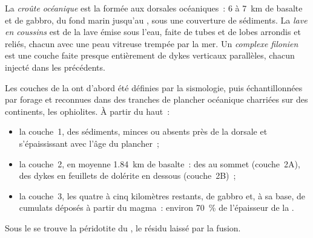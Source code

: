 \begin{definition}\label{def:b1:rifts-ridges-margins:oceanic-crust}
La \emph{croûte océanique} est la  formée aux
dorsales océaniques~: 6 à \qty{7}{km} de basalte et de gabbro, du fond marin jusqu'au
, sous une couverture de sédiments. La \emph{lave en coussins} est de la
lave émise sous l'eau, faite de tubes et de lobes arrondis et reliés, chacun
avec une peau vitreuse trempée par la mer. Un \emph{complexe
filonien} est une couche faite presque entièrement de
dykes verticaux parallèles, chacun injecté dans les précédents.
\end{definition}

Les couches de la  ont d'abord été définies par la sismologie, puis échantillonnées
par forage et reconnues dans des tranches de plancher océanique charriées sur des continents,
les ophiolites. À partir du haut~:
\begin{itemize}
  \item la couche~1, des sédiments, minces ou absents près de la dorsale et s'épaississant avec
        l'âge du plancher~;
  \item la couche~2, en moyenne \qty{1.84}{km} de basalte~: des  au sommet
        (couche~2A), des dykes en feuillets de dolérite en dessous (couche~2B)~;
  \item la couche~3, les quatre à cinq kilomètres restants, de gabbro et, à sa
        base, de cumulats déposés à partir du magma~: environ \qty{70}{\percent} de
        l'épaisseur de la .
\end{itemize}
Sous le  se trouve la péridotite du , le résidu laissé par la fusion.


